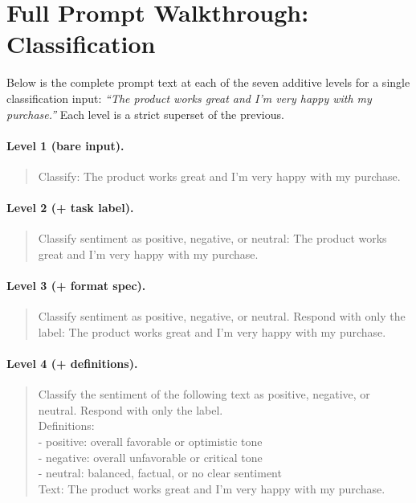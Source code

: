 \section{Full Prompt Walkthrough: Classification}
\label{app:cls-walkthrough}

Below is the complete prompt text at each of the seven additive levels for
a single classification input: \textit{``The product works great and I'm very
happy with my purchase.''}
Each level is a strict superset of the previous.

\paragraph{Level 1 (bare input).}
\begin{quote}\small\ttfamily
Classify: The product works great and I'm very happy with my purchase.
\end{quote}

\paragraph{Level 2 (+ task label).}
\begin{quote}\small\ttfamily
Classify sentiment as positive, negative, or neutral: The product works great
and I'm very happy with my purchase.
\end{quote}

\paragraph{Level 3 (+ format spec).}
\begin{quote}\small\ttfamily
Classify sentiment as positive, negative, or neutral. Respond with only the
label: The product works great and I'm very happy with my purchase.
\end{quote}

\paragraph{Level 4 (+ definitions).}
\begin{quote}\small\ttfamily
Classify the sentiment of the following text as positive, negative, or neutral.
Respond with only the label.\\[4pt]
Definitions:\\
- positive: overall favorable or optimistic tone\\
- negative: overall unfavorable or critical tone\\
- neutral: balanced, factual, or no clear sentiment\\[4pt]
Text: The product works great and I'm very happy with my purchase.
\end{quote}

